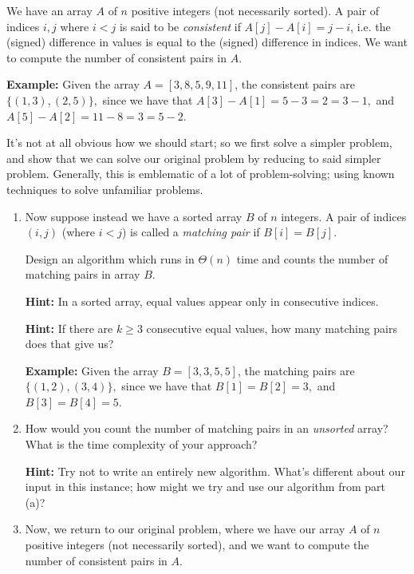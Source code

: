 \documentclass[12pt]{article}
\begin{document}

\begin{question}
    We have an array \(A\) of \(n\) positive integers (not necessarily sorted). A pair of indices \(i,j\) where \(i < j\) is said to be \emph{consistent} if \(A[j] - A[i] = j - i\), i.e. the (signed) difference in values is equal to the (signed) difference in indices. We want to compute the number of consistent pairs in \(A\).

    \textbf{Example:} Given the array \(A = [3, 8, 5, 9, 11]\), the consistent pairs are \(\{(1, 3), (2, 5)\},\) since we have that \(A[3]-A[1]=5-3=2=3-1, \) and \(A[5]-A[2]=11-8=3=5-2\).
    
    It's not at all obvious how we should start; so we first solve a simpler problem, and show that we can solve our original problem by reducing to said simpler problem. Generally, this is emblematic of a lot of problem-solving; using known techniques to solve unfamiliar problems.
    
\begin{enumerate}[label=(\alph*)]
    \item Now suppose instead we have a sorted array \(B\) of \(n\) integers. A pair of indices \((i,j)\) (where $i < j$) is called a \emph{matching pair} if \(B[i] = B[j]\).

    Design an algorithm which runs in \(\Theta(n)\) time and counts the number of matching pairs in array \(B\).

    \textbf{Hint:} In a sorted array, equal values appear only in consecutive indices.

    \textbf{Hint:} If there are \(k \geq 3\) consecutive equal values, how many matching pairs does that give us? 

    \textbf{Example:} Given the array \(B = [3, 3, 5, 5]\), the matching pairs are \(\{(1, 2), (3, 4)\},\) since we have that \(B[1]=B[2]=3, \) and \(B[3] = B[4] = 5\).
    
    \item How would you count the number of matching pairs in an \emph{unsorted} array? What is the time complexity of your approach?

    \textbf{Hint:} Try not to write an entirely new algorithm. What's different about our input in this instance; how might we try and use our algorithm from part (a)?

    \item Now, we return to our original problem, where we have our array \(A\) of \(n\) positive integers (not necessarily sorted), and we want to compute the number of consistent pairs in \(A\).


\end{enumerate}
\end{question}
\end{document}
